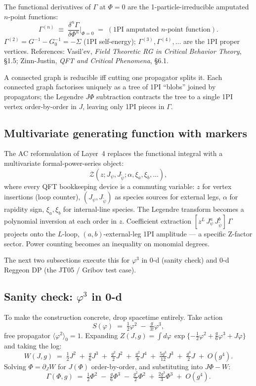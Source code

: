 \documentclass[11pt,a4paper]{article}
\begin{document}
\begin{theorembox}
The functional derivatives of $\Gamma$ at $\Phi=0$ are the 1-particle-irreducible
amputated $n$-point functions:
\[
\Gamma^{(n)} \;\equiv\; \frac{\delta^n \Gamma}{\delta \Phi^n}\bigg|_{\Phi=0} \;=\; (\text{1PI amputated $n$-point function}).
\]
$\Gamma^{(2)} = G^{-1} - G_0^{-1} = -\Sigma$ (1PI self-energy);
$\Gamma^{(3)}, \Gamma^{(4)}, \ldots$ are the 1PI proper vertices.
References: Vasil'ev, \emph{Field Theoretic RG in Critical Behavior Theory},
\S1.5; Zinn-Justin, \emph{QFT and Critical Phenomena}, \S6.1.
\end{theorembox}

A connected graph is reducible iff cutting one propagator splits it. Each
connected graph factorises uniquely as a tree of 1PI ``blobs'' joined by
propagators; the Legendre $J\Phi$ subtraction contracts the tree to a single
1PI vertex order-by-order in $J$, leaving only 1PI pieces in $\Gamma$.

\subsection{Multivariate generating function with markers}

The AC reformulation of Layer~4 replaces the functional integral with a
multivariate formal-power-series object:
\[
\mathcal{Z}(z; J_\psi, J_{\tilde\psi}; \alpha,\xi_a,\xi_b,\ldots),
\]
where every QFT bookkeeping device is a commuting variable: $z$ for vertex
insertions (loop counter), $(J_\psi, J_{\tilde\psi})$ as species sources for
external legs, $\alpha$ for rapidity sign, $\xi_a, \xi_b$ for internal-line
species. The Legendre transform becomes a polynomial inversion at each order
in $z$. Coefficient extraction $[z^L\,J_\psi^a\,J_{\tilde\psi}^b]\,\Gamma$ projects
onto the $L$-loop, $(a,b)$-external-leg 1PI amplitude --- a specific Z-factor
sector. Power counting becomes an inequality on monomial degrees.

The next two subsections execute this for $\varphi^3$ in 0-d (sanity check)
and 0-d Reggeon DP (the JT05 / Gribov test case).

\subsection{Sanity check: $\varphi^3$ in 0-d}

To make the construction concrete, drop spacetime entirely. Take action
\[
S(\varphi) \;=\; \tfrac{1}{2}\varphi^2 \;-\; \tfrac{g}{3!}\varphi^3,
\]
free propagator $\langle\varphi^2\rangle_0=1$. Expanding
$Z(J,g) = \int d\varphi\,\exp\{-\tfrac12\varphi^2 + \tfrac{g}{6}\varphi^3 + J\varphi\}$
and taking the log:
\[
W(J,g) \;=\; \tfrac12 J^2 \;+\; \tfrac{g}{6}J^3 \;+\; \tfrac{g^2}{2}J^2 \;+\; \tfrac{g^2}{8}J^4 \;+\; \tfrac{5g^3}{12}J^3 \;+\; \tfrac{g^3}{2}J \;+\; O(g^4).
\]
Solving $\Phi=\partial_J W$ for $J(\Phi)$ order-by-order, and substituting into
$J\Phi - W$:
\[
\Gamma(\Phi,g) \;=\; \tfrac12\Phi^2 \;-\; \tfrac{g}{6}\Phi^3 \;-\; \tfrac{g^2}{2}\Phi^2 \;+\; \tfrac{2g^3}{3}\Phi^3 \;+\; O(g^4).
\]
\end{document}
